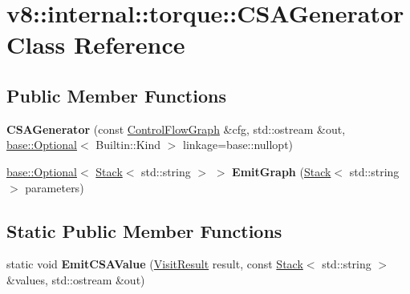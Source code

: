 \hypertarget{classv8_1_1internal_1_1torque_1_1CSAGenerator}{}\section{v8\+:\+:internal\+:\+:torque\+:\+:C\+S\+A\+Generator Class Reference}
\label{classv8_1_1internal_1_1torque_1_1CSAGenerator}
\subsection*{Public Member Functions}
\begin{DoxyCompactItemize}
\item 
\mbox{\label{classv8_1_1internal_1_1torque_1_1CSAGenerator_a1afce15034444b89d3f8f57d796b7af7}} 
{\bfseries C\+S\+A\+Generator} (const \mbox{\hyperlink{classv8_1_1internal_1_1torque_1_1ControlFlowGraph}{Control\+Flow\+Graph}} \&cfg, std\+::ostream \&out, \mbox{\hyperlink{classv8_1_1base_1_1Optional}{base\+::\+Optional}}$<$ Builtin\+::\+Kind $>$ linkage=base\+::nullopt)
\item 
\mbox{\label{classv8_1_1internal_1_1torque_1_1CSAGenerator_a7cd45562fd400499ba3402c30b3d80e4}} 
\mbox{\hyperlink{classv8_1_1base_1_1Optional}{base\+::\+Optional}}$<$ \mbox{\hyperlink{classv8_1_1internal_1_1torque_1_1Stack}{Stack}}$<$ std\+::string $>$ $>$ {\bfseries Emit\+Graph} (\mbox{\hyperlink{classv8_1_1internal_1_1torque_1_1Stack}{Stack}}$<$ std\+::string $>$ parameters)
\end{DoxyCompactItemize}
\subsection*{Static Public Member Functions}
\begin{DoxyCompactItemize}
\item 
\mbox{\label{classv8_1_1internal_1_1torque_1_1CSAGenerator_abc708afa7a21457af8c7c32e302d8889}} 
static void {\bfseries Emit\+C\+S\+A\+Value} (\mbox{\hyperlink{classv8_1_1internal_1_1torque_1_1VisitResult}{Visit\+Result}} result, const \mbox{\hyperlink{classv8_1_1internal_1_1torque_1_1Stack}{Stack}}$<$ std\+::string $>$ \&values, std\+::ostream \&out)
\end{DoxyCompactItemize}
